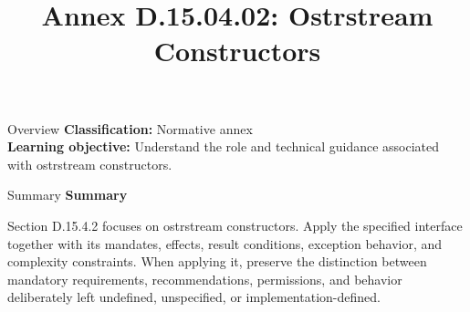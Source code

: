 \documentclass[10pt,letterpaper]{article}
\title{Annex D.15.04.02: Ostrstream Constructors}
\author{}
\date{}
\begin{document}
\maketitle
\begin{CornellOverviewBox}{Overview}
\textbf{Classification:} Normative annex\\[2pt]
\textbf{Learning objective:} Understand the role and technical guidance associated with ostrstream constructors.
\end{CornellOverviewBox}\begin{CornellSummaryBox}{Summary}
{\sffamily\bfseries\color{Accent} Summary}\par\vspace{3pt}Section D.15.4.2 focuses on ostrstream constructors. Apply the specified interface together with its mandates, effects, result conditions, exception behavior, and complexity constraints. When applying it, preserve the distinction between mandatory requirements, recommendations, permissions, and behavior deliberately left undefined, unspecified, or implementation-defined.
\end{CornellSummaryBox}
\end{document}
